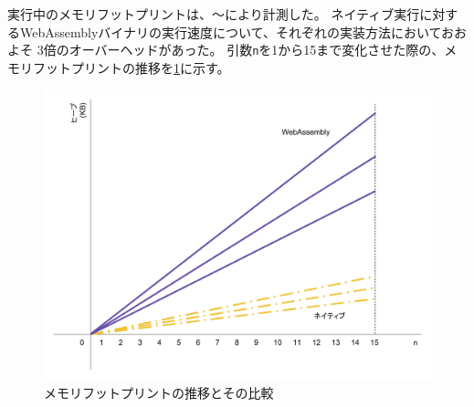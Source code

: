 実行中のメモリフットプリントは、〜により計測した。
ネイティブ実行に対するWebAssemblyバイナリの実行速度について、それぞれの実装方法においておおよそ
3倍のオーバーヘッドがあった。
引数\verb|n|を1から15まで変化させた際の、メモリフットプリントの推移を\ref{fig:heap_size}に示す。

\begin{figure}[htbp]
  \caption{メモリフットプリントの推移とその比較}
  \label{fig:heap_size}
  \begin{center}
    \includegraphics[bb=0 0 800 600,width=12cm]{img/heap_size.pdf}
  \end{center}
\end{figure}
